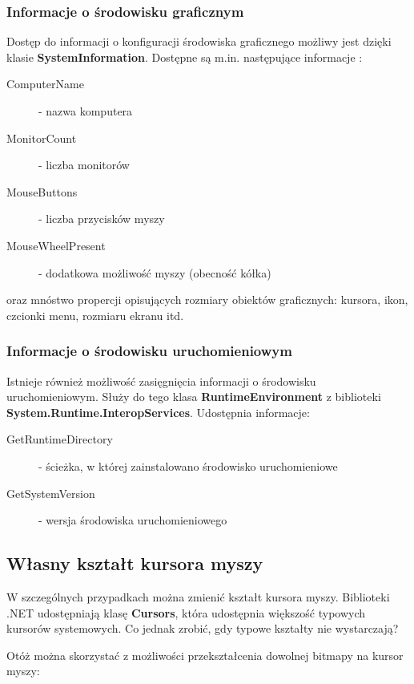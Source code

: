 \subsubsection{Informacje o środowisku graficznym}

Dostęp do informacji o konfiguracji środowiska graficznego możliwy jest dzięki klasie {\bf SystemInformation}.
Dostępne są m.in. następujące informacje :

\begin{description}
\item [ComputerName] - nazwa komputera
\item [MonitorCount] - liczba monitorów
\item [MouseButtons] - liczba przycisków myszy
\item [MouseWheelPresent] - dodatkowa możliwość myszy (obecność kółka)
\end{description}

oraz mnóstwo propercji opisujących rozmiary obiektów graficznych: kursora, ikon, czcionki menu, rozmiaru
ekranu itd.

\subsubsection{Informacje o środowisku uruchomieniowym}

Istnieje również możliwość zasięgnięcia informacji o środowisku uruchomieniowym. Służy do tego
klasa {\bf RuntimeEnvironment} z biblioteki {\bf System.Runtime.InteropServices}. Udostępnia informacje:

\begin{description}
\item [GetRuntimeDirectory] - ścieżka, w której zainstalowano środowisko uruchomieniowe
\item [GetSystemVersion] - wersja środowiska uruchomieniowego
\end{description}

\subsection{Własny kształt kursora myszy}

W szczególnych przypadkach można zmienić kształt kursora myszy. Biblioteki .NET udostępniają klasę
{\bf Cursors}, która udostępnia większość typowych kursorów systemowych. Co jednak zrobić, gdy
typowe kształty nie wystarczają?

Otóż można skorzystać z możliwości przekształcenia dowolnej bitmapy na kursor myszy:

